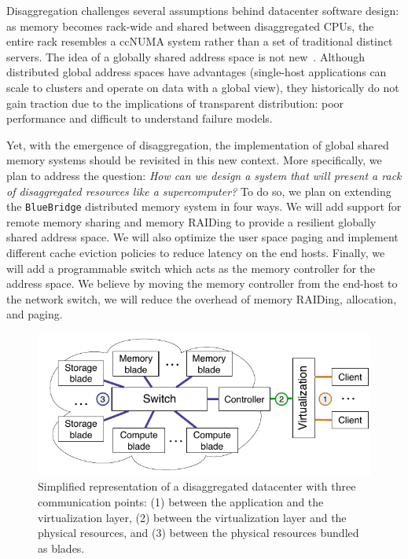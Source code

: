 Disaggregation challenges several assumptions behind datacenter software
design: as memory becomes rack-wide and shared between disaggregated CPUs, the
entire rack resembles a ccNUMA system rather than a set of traditional
distinct servers. 
The idea of a globally shared address space is not new~\cite{Nelson2015,Keleher1994}.
Although distributed global address spaces have advantages (single-host
applications can scale to clusters and operate on data with a global view),
they historically do not gain traction due to the implications of transparent
distribution: poor performance and difficult to understand failure models. 


Yet, with the emergence of disaggregation, the implementation of global shared
memory systems should be revisited in this new context. More specifically, we
plan to address the question: \emph{How can we design a system that will
present a rack of disaggregated resources like a supercomputer?} To do so, we
plan on extending the \texttt{BlueBridge} distributed memory system in four
ways. We will add support for remote memory sharing and memory RAIDing to
provide a resilient globally shared address space. We will also optimize the
user space paging and implement different cache eviction policies to reduce
latency on the end hosts. Finally, we will add a programmable switch which acts
as the memory controller for the address space. We believe by moving the memory
controller from the end-host to the network switch, we will reduce the overhead
of memory RAIDing, allocation, and paging.


\begin{figure}
    \centering
    \includegraphics[width=\columnwidth]{fig/ddc-overview}
    \caption{Simplified representation of a disaggregated datacenter with
    three communication points: (1) between the application and the
    virtualization layer,
    (2) between the virtualization layer and the physical resources, and (3)
    between the physical resources bundled as blades.}
    \label{fig:DDC}
\end{figure}
